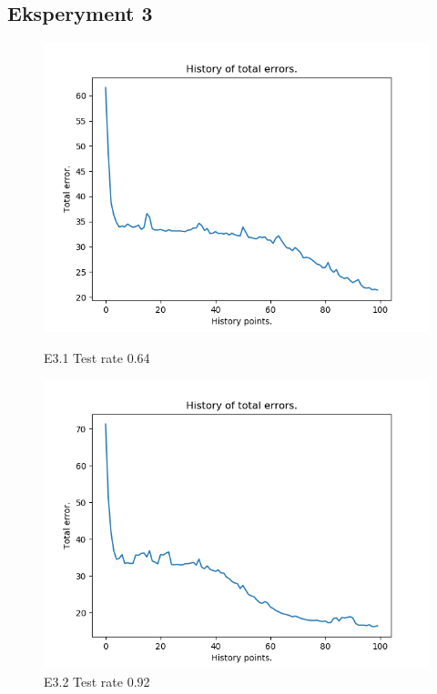 \documentclass{classrep}
\begin{document}
	\subsection{Eksperyment 3}
		\begin{figure}[H]
			\begin{minipage}{0.5\linewidth}
				\centering
				\includegraphics[scale=0.25]{iris_nn_m3.png}
				\caption{E3.1 Test rate  0.64}
			\end{minipage}
			\begin{minipage}{0.5\linewidth}
				\centering
				\includegraphics[scale=0.25]{iris_nn_m5.png}
				\caption{E3.2 Test rate  0.92}
				\label{E3.2}
			\end{minipage}
			\begin{minipage}{0.5\linewidth}

\end{minipage}
\end{figure}
\end{document}

